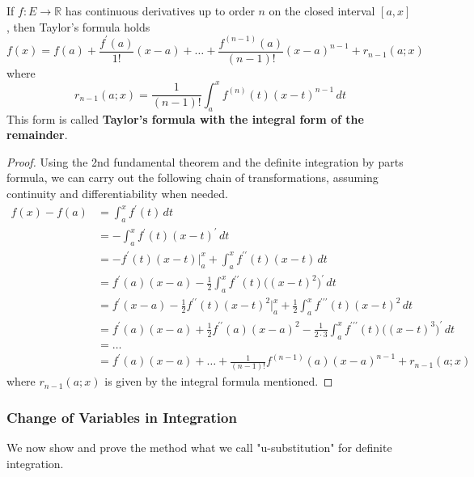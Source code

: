 \documentclass{article}
\begin{document}
      \begin{theorem}
      If $f: E \longrightarrow \mathbb{R}$ has continuous derivatives up to order $n$ on the closed interval $[a, x]$, then Taylor's formula holds
      \[f(x) = f(a) + \frac{f^\prime (a)}{1!} (x - a) + \ldots + \frac{f^{(n-1)}(a)}{(n-1)!} (x - a)^{n-1} + r_{n-1}(a; x)\]
      where 
      \[r_{n-1} (a;x) = \frac{1}{(n-1)!} \int_a^x f^{(n)} (t) (x - t)^{n-1} \,dt\]
      This form is called \textbf{Taylor's formula with the integral form of the remainder}. 
      \end{theorem}
      \begin{proof}
      Using the 2nd fundamental theorem and the definite integration by parts formula, we can carry out the following chain of transformations, assuming continuity and differentiability when needed. 
      \begin{align*}
          f(x) - f(a) & = \int_a^x f^\prime (t) \,dt \\
          & = - \int_a^x f^\prime(t) (x - t)^\prime \,dt \\
          & = -f^\prime (t) (x - t)\big|_a^x + \int_a^x f^{\prime\prime} (t) (x - t) \,dt \\
          & = f^\prime (a) (x - a) - \frac{1}{2} \int_a^x f^{\prime\prime} (t) \big( (x - t)^2\big)^\prime \,dt \\
          & = f^\prime (x - a) - \frac{1}{2} f^{\prime\prime} (t) (x - t)^2 \big|_a^x + \frac{1}{2} \int_a^x f^{\prime\prime\prime} (t) (x - t)^2\,dt \\
          & = f^\prime(a) (x - a) + \frac{1}{2} f^{\prime\prime} (a) (x - a)^2 - \frac{1}{2 \cdot 3} \int_a^x f^{\prime\prime\prime} (t) \big((x - t)^3\big)^\prime\,dt \\
          & = \ldots \\
          & = f^\prime (a) (x - a) + \ldots + \frac{1}{(n-1)!} f^{(n-1)} (a)(x - a)^{n-1} + r_{n-1}(a;x)
      \end{align*}
      where $r_{n-1}(a;x)$ is given by the integral formula mentioned. 
      \end{proof}

      \subsubsection{Change of Variables in Integration}
      We now show and prove the method what we call "u-substitution" for definite integration. 
\end{document}
